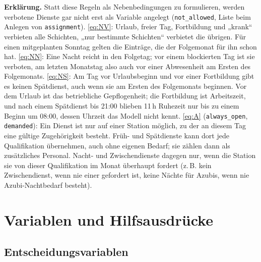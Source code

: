 \documentclass[11pt]{combiArticle}
\newcommand{\code}[1]{\texttt{#1}}
\begin{document}
\textbf{Erklärung.}
Statt diese Regeln als Nebenbedingungen zu formulieren, werden verbotene Dienste gar nicht erst als Variable
angelegt (\code{not\_allowed}, Liste beim Anlegen von \code{assignment}).
\eqref{eq:NV}: Urlaub, freier Tag, Fortbildung und „krank“ verbieten alle Schichten, „nur
bestimmte Schichten“ verbietet die übrigen. Für einen mitgeplanten Sonntag gelten die Einträge, die der Folgemonat
für ihn schon hat.
\eqref{eq:NN}: Eine Nacht reicht in den Folgetag; vor einem blockierten Tag ist sie verboten, am letzten
Monatstag also auch vor einer Abwesenheit am Ersten des Folgemonats.
\eqref{eq:NS}: Am Tag vor Urlaubsbeginn und vor einer Fortbildung gibt es keinen Spätdienst, auch wenn sie am
Ersten des Folgemonats beginnen. Vor dem Urlaub ist das betriebliche Gepflogenheit; die Fortbildung ist
Arbeitszeit, und nach einem Spätdienst bis 21:00 blieben 11\,h Ruhezeit nur bis zu einem Beginn um 08:00, dessen
Uhrzeit das Modell nicht kennt.
\eqref{eq:A} (\code{always\_open}, \code{demanded}): Ein Dienst ist nur auf einer Station möglich, zu der an
diesem Tag eine gültige Zugehörigkeit besteht. Früh- und Spätdienste kann dort jede Qualifikation übernehmen, auch
ohne eigenen Bedarf; sie zählen dann als zusätzliches Personal. Nacht- und Zwischendienste dagegen nur, wenn die
Station sie von dieser Qualifikation im Monat überhaupt fordert (z.\,B. kein Zwischendienst, wenn nie einer
gefordert ist, keine Nächte für Azubis, wenn nie Azubi-Nachtbedarf besteht).

\section{Variablen und Hilfsausdrücke}

\subsection{Entscheidungsvariablen}
\end{document}
